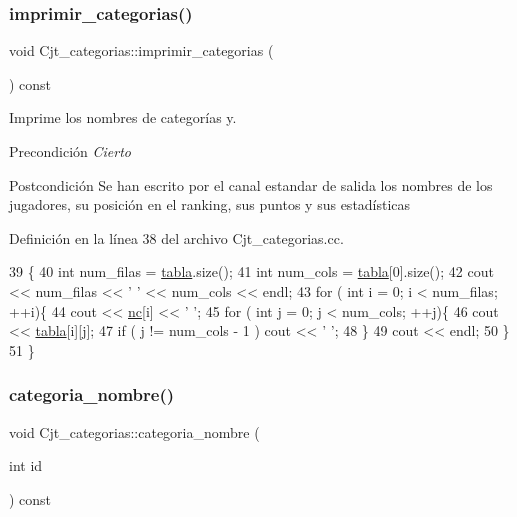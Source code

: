 \subsubsection{\texorpdfstring{imprimir\+\_\+categorias()}{imprimir\_categorias()}}
{\footnotesize\ttfamily void Cjt\+\_\+categorias\+::imprimir\+\_\+categorias (\begin{DoxyParamCaption}{ }\end{DoxyParamCaption}) const}



Imprime los nombres de categorías y. 

\begin{DoxyPrecond}{Precondición}
{\itshape Cierto} 
\end{DoxyPrecond}
\begin{DoxyPostcond}{Postcondición}
Se han escrito por el canal estandar de salida los nombres de los jugadores, su posición en el ranking, sus puntos y sus estadísticas 
\end{DoxyPostcond}


Definición en la línea 38 del archivo Cjt\+\_\+categorias.\+cc.


\begin{DoxyCode}
39 \{
40     \textcolor{keywordtype}{int} num\_filas = \hyperlink{class_cjt__categorias_af03722d79d2b1ec784954dd13a7168eb}{tabla}.size();
41     \textcolor{keywordtype}{int} num\_cols = \hyperlink{class_cjt__categorias_af03722d79d2b1ec784954dd13a7168eb}{tabla}[0].size();
42     cout << num\_filas << \textcolor{charliteral}{' '} << num\_cols << endl;
43     \textcolor{keywordflow}{for} ( \textcolor{keywordtype}{int} i = 0; i < num\_filas; ++i)\{
44         cout << \hyperlink{class_cjt__categorias_aad3febb4a17038ba65b2f79a4a509289}{nc}[i] << \textcolor{charliteral}{' '};
45         \textcolor{keywordflow}{for} ( \textcolor{keywordtype}{int} j = 0; j < num\_cols; ++j)\{
46             cout << \hyperlink{class_cjt__categorias_af03722d79d2b1ec784954dd13a7168eb}{tabla}[i][j];
47             \textcolor{keywordflow}{if} ( j != num\_cols - 1 )  cout << \textcolor{charliteral}{' '};
48         \}
49         cout << endl;
50     \}   
51 \}
\end{DoxyCode}
\mbox{\label{class_cjt__categorias_a1b0f9a447879796a42ee0dac753f8779}} 
\subsubsection{\texorpdfstring{categoria\+\_\+nombre()}{categoria\_nombre()}}
{\footnotesize\ttfamily void Cjt\+\_\+categorias\+::categoria\+\_\+nombre (\begin{DoxyParamCaption}\item[{int}]{id }\end{DoxyParamCaption}) const}



